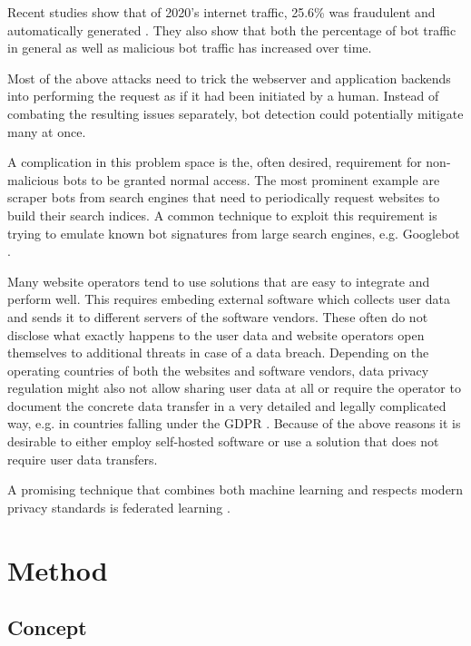 \documentclass[
    fontsize=12pt,
    headings=small,
    parskip=half,           %
    bibliography=totoc,
    numbers=noenddot,       %
    open=any,               %
    ]{scrreprt}
\begin{document}
Recent studies show that of 2020's internet traffic, 25.6\% was fraudulent and automatically generated \cite{BAD_BOT_REPORT2020} \cite{BAD_BOT_REPORT2021}. They also show that both the percentage of bot traffic in general as well as malicious bot traffic has increased over time.

Most of the above attacks need to trick the webserver and application backends into performing the request as if it had been initiated by a human. Instead of combating the resulting issues separately, bot detection could potentially mitigate many at once.

A complication in this problem space is the, often desired, requirement for non-malicious bots to be granted normal access. The most prominent example are scraper bots from search engines that need to periodically request websites to build their search indices. A common technique to exploit this requirement is trying to emulate known bot signatures from large search engines, e.g. Googlebot \cite{TODO}.

Many website operators tend to use solutions that are easy to integrate and perform well. This requires embeding external software which collects user data and sends it to different servers of the software vendors. These often do not disclose what exactly happens to the user data and website operators open themselves to additional threats in case of a data breach. Depending on the operating countries of both the websites and software vendors, data privacy regulation might also not allow sharing user data at all or require the operator to document the concrete data transfer in a very detailed and legally complicated way, e.g. in countries falling under the GDPR \cite{GDPR}. Because of the above reasons it is desirable to either employ self-hosted software or use a solution that does not require user data transfers.


A promising technique that combines both machine learning and respects modern privacy standards is federated learning \cite{DBLP:journals/corr/KonecnyMR15} \cite{DBLP:journals/corr/KonecnyMRR16}.

\chapter{Method}

\section{Concept}
\end{document}
